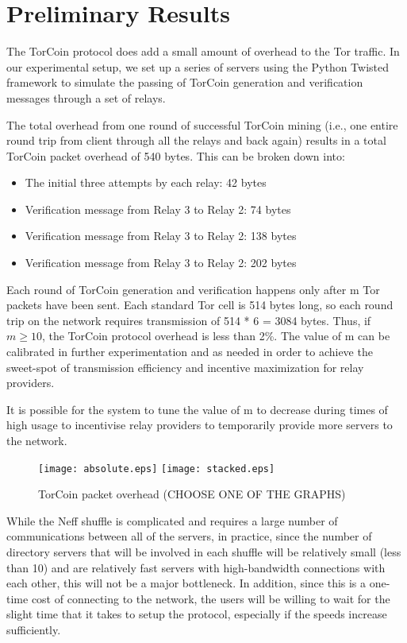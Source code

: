 \section{Preliminary Results}

The TorCoin protocol does add a small amount of overhead to the Tor traffic. In our experimental setup, we set up a series of servers using the Python Twisted framework to simulate the passing of TorCoin generation and verification messages through a set of relays. 

The total overhead from one round of successful TorCoin mining (i.e., one entire round trip from client through all the relays and back again) results in a total TorCoin packet overhead of 540 bytes. This can be broken down into: 
\begin{itemize}
\item The initial three attempts by each relay: 42 bytes
\item Verification message from Relay 3 to Relay 2: 74 bytes
\item Verification message from Relay 3 to Relay 2: 138 bytes
\item Verification message from Relay 3 to Relay 2: 202 bytes
\end{itemize}

Each round of TorCoin generation and verification happens only after m Tor packets have been sent. Each standard Tor cell is 514 bytes long, so each round trip on the network requires transmission of 514 * 6 = 3084 bytes. Thus, if $m \geq 10$, the TorCoin protocol overhead is less than 2\%. The value of m can be calibrated in further experimentation and as needed in order to achieve the sweet-spot of transmission efficiency and incentive maximization for relay providers.

It is possible for the system to tune the value of m to decrease during times of high usage to incentivise relay providers to temporarily provide more servers to the network.

\begin{figure}
  \centering
    \texttt{[image: absolute.eps]}
    \texttt{[image: stacked.eps]}
  \caption{TorCoin packet overhead (CHOOSE ONE OF THE GRAPHS)}
\end{figure}

While the Neff shuffle is complicated and requires a large number of communications between all of the servers, in practice, since the number of directory servers that will be involved in each shuffle will be relatively small (less than 10) and are relatively fast servers with high-bandwidth connections with each other, this will not be a major bottleneck. In addition, since this is a one-time cost of connecting to the network, the users will be willing to wait for the slight time that it takes to setup the protocol, especially if the speeds increase sufficiently.